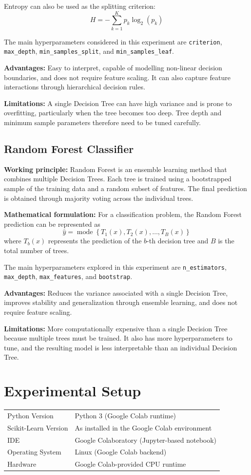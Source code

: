 \documentclass[12pt,a4paper]{article}
\begin{document}
Entropy can also be used as the splitting criterion:
\[
H = -\sum_{k=1}^{K}p_k\log_2(p_k)
\]

The main hyperparameters considered in this experiment are \texttt{criterion}, \texttt{max\_depth}, \texttt{min\_samples\_split}, and \texttt{min\_samples\_leaf}.

\textbf{Advantages:} Easy to interpret, capable of modelling non-linear decision boundaries, and does not require feature scaling. It can also capture feature interactions through hierarchical decision rules.

\textbf{Limitations:} A single Decision Tree can have high variance and is prone to overfitting, particularly when the tree becomes too deep. Tree depth and minimum sample parameters therefore need to be tuned carefully.

\subsection*{Random Forest Classifier}

\textbf{Working principle:} Random Forest is an ensemble learning method that combines multiple Decision Trees. Each tree is trained using a bootstrapped sample of the training data and a random subset of features. The final prediction is obtained through majority voting across the individual trees.

\textbf{Mathematical formulation:}
For a classification problem, the Random Forest prediction can be represented as
\[
\hat{y} = \operatorname{mode}
\left\{
T_1(x),T_2(x),\ldots,T_B(x)
\right\}
\]
where $T_b(x)$ represents the prediction of the $b$-th decision tree and $B$ is the total number of trees.

The main hyperparameters explored in this experiment are \texttt{n\_estimators}, \texttt{max\_depth}, \texttt{max\_features}, and \texttt{bootstrap}.

\textbf{Advantages:} Reduces the variance associated with a single Decision Tree, improves stability and generalization through ensemble learning, and does not require feature scaling.

\textbf{Limitations:} More computationally expensive than a single Decision Tree because multiple trees must be trained. It also has more hyperparameters to tune, and the resulting model is less interpretable than an individual Decision Tree.
\section{Experimental Setup}
\begin{tabular}{ll}
\toprule
Python Version & Python 3 (Google Colab runtime)\\
Scikit-Learn Version & As installed in the Google Colab environment\\
IDE & Google Colaboratory (Jupyter-based notebook)\\
Operating System & Linux (Google Colab backend)\\
Hardware & Google Colab-provided CPU runtime\\
\bottomrule
\end{tabular}
\end{document}
